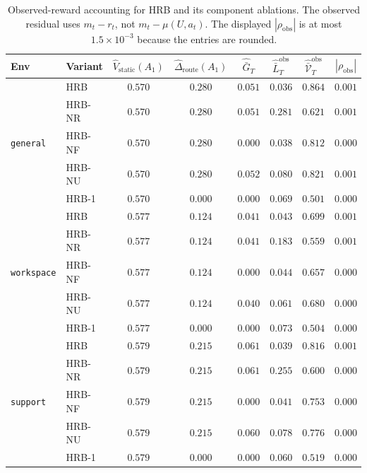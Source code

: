 \documentclass{article} %
\begin{document}
\begin{table}[h]
\centering
\small
\setlength{\tabcolsep}{4pt}
\caption{Observed-reward accounting for HRB and its component ablations. The
observed residual uses \(m_t-r_t\), not \(m_t-\mu(U,a_t)\). The displayed
\(|\rho_{\mathrm{obs}}|\) is at most \(1.5\times10^{-3}\) because the entries
are rounded.}
\label{tab:app-decomp-full}
\begin{tabular}{llcccccc}
\toprule
Env & Variant & $\widehat V_{\mathrm{static}}(A_1)$ & $\widehat\Delta_{\mathrm{route}}(A_1)$ & $\widehat{\bar G}_T$ & $\widehat{\bar L}_T^{\mathrm{obs}}$ & $\widehat{\bar{\mathcal V}}_T^{\mathrm{obs}}$ & $|\rho_{\mathrm{obs}}|$ \\
\midrule
\multirow{5}{*}{\texttt{general}}
 & \textnormal{HRB}                & $0.570$ & $0.280$ & $0.051$ & $0.036$ & $0.864$ & $0.001$ \\
 & \textnormal{HRB-NR}         & $0.570$ & $0.280$ & $0.051$ & $0.281$ & $0.621$ & $0.001$ \\
 & \textnormal{HRB-NF}      & $0.570$ & $0.280$ & $0.000$ & $0.038$ & $0.812$ & $0.000$ \\
 & \textnormal{HRB-NU} & $0.570$ & $0.280$ & $0.052$ & $0.080$ & $0.821$ & $0.001$ \\
 & \textnormal{HRB-1}         & $0.570$ & $0.000$ & $0.000$ & $0.069$ & $0.501$ & $0.000$ \\
\midrule
\multirow{5}{*}{\texttt{workspace}}
 & \textnormal{HRB}                & $0.577$ & $0.124$ & $0.041$ & $0.043$ & $0.699$ & $0.001$ \\
 & \textnormal{HRB-NR}         & $0.577$ & $0.124$ & $0.041$ & $0.183$ & $0.559$ & $0.001$ \\
 & \textnormal{HRB-NF}      & $0.577$ & $0.124$ & $0.000$ & $0.044$ & $0.657$ & $0.000$ \\
 & \textnormal{HRB-NU} & $0.577$ & $0.124$ & $0.040$ & $0.061$ & $0.680$ & $0.000$ \\
 & \textnormal{HRB-1}         & $0.577$ & $0.000$ & $0.000$ & $0.073$ & $0.504$ & $0.000$ \\
\midrule
\multirow{5}{*}{\texttt{support}}
 & \textnormal{HRB}                & $0.579$ & $0.215$ & $0.061$ & $0.039$ & $0.816$ & $0.001$ \\
 & \textnormal{HRB-NR}         & $0.579$ & $0.215$ & $0.061$ & $0.255$ & $0.600$ & $0.000$ \\
 & \textnormal{HRB-NF}      & $0.579$ & $0.215$ & $0.000$ & $0.041$ & $0.753$ & $0.000$ \\
 & \textnormal{HRB-NU} & $0.579$ & $0.215$ & $0.060$ & $0.078$ & $0.776$ & $0.000$ \\
 & \textnormal{HRB-1}         & $0.579$ & $0.000$ & $0.000$ & $0.060$ & $0.519$ & $0.000$ \\
\bottomrule
\end{tabular}

\end{table}
\end{document}
